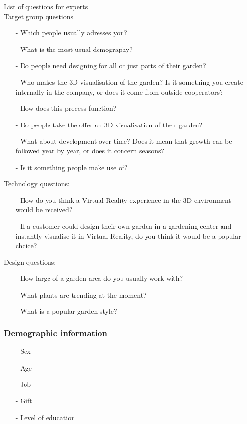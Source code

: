 		List of questions for experts \\
		Target group questions:
		\begin{itemize}
			\item[-] Which people usually adresses you?
			\item[-] What is the most usual demography?
			\item[-] Do people need designing for all or just parts of their garden?
			\item[-] Who makes the 3D visualisation of the garden? Is it something you create internally in the company, or does it come from outside cooperators? 
			\item[-] How does this process function?
			\item[-] Do people take the offer on 3D visualisation of their garden?
			\item[-] What about development over time? Does it mean that growth can be followed year by year, or does it concern seasons?
			\item[-] Is it something people make use of? \\
		\end{itemize}
		
		Technology questions:
		\begin{itemize}
			\item[-] How do you think a Virtual Reality experience in the 3D environment would be received?
			\item[-] If a customer could design their own garden in a gardening center and instantly visualise it in Virtual Reality, do you think it would be a popular choice? \\
		\end{itemize}
		
		Design questions:
		\begin{itemize}
			\item[-] How large of a garden area do you usually work with?
			\item[-] What plants are trending at the moment?
			\item[-] What is a popular garden style?
		\end{itemize}

		\subsubsection{Demographic information}
		\begin{itemize}
			\item[-] Sex
			\item[-] Age
			\item[-] Job
			\item[-] Gift
			\item[-] Level of education
		\end{itemize}

